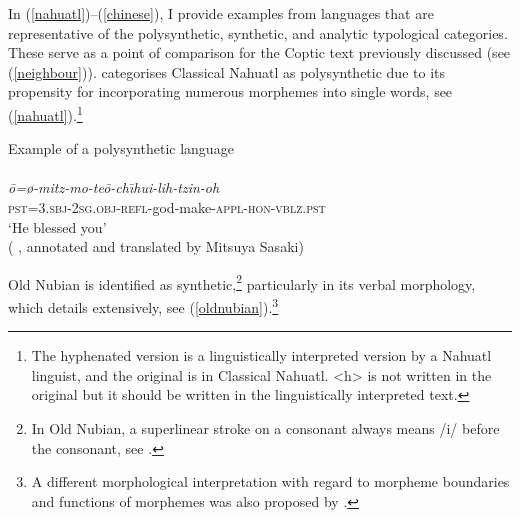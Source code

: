 \documentclass[output=paper,colorlinks,citecolor=brown ,chinesefont]{langscibook}
\begin{document}
In (\ref{nahuatl})--(\ref{chinese}), I provide examples from languages that are representative of the polysynthetic, synthetic, and analytic typological categories. These serve as a point of comparison for the Coptic text previously discussed (see (\ref{neighbour})). \citet[252]{fortescue} categorises Classical Nahuatl as polysynthetic due to its propensity for incorporating numerous morphemes into single words, see (\ref{nahuatl}).\footnote{The hyphenated version is a linguistically interpreted version by a Nahuatl linguist, and the original is in Classical Nahuatl. <h> is not written in the original but it should be written in the linguistically interpreted text.}

\begin{exe}
\ex\label{nahuatl} Example of a polysynthetic language \\
\settowidth {}
 \\
\textit{\={o}={\o}-mitz-mo-te\={o}-ch\={\i}hui-lih-tzin-oh} \\
\textsc{pst}=3.\textsc{sbj}-2\textsc{sg}.\textsc{obj}-\textsc{refl}-god-make-\textsc{appl}-\textsc{hon}-\textsc{vblz}.\textsc{pst} \\ 
\glt ‘He blessed you' \\
\hspace*{\fill}( \citep{leon}, annotated and translated by Mitsuya Sasaki)
\end{exe}


Old Nubian is identified as synthetic,\footnote{In Old Nubian, a superlinear stroke on a consonant always means /i/ before the consonant, see \citet[38]{gervenoei}. } particularly in its verbal morphology, which \citet[171]{van2014remarks} details extensively, see (\ref{oldnubian}).\footnote{A different morphological interpretation with regard to morpheme boundaries and functions of morphemes was also proposed by \citet[751]{satzinger}.}
\end{document}
